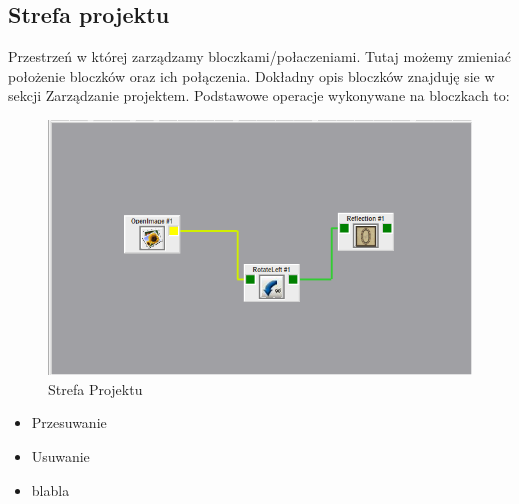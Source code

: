 \documentclass[a4paper,10pt]{article}
\begin{document}
\subsection{Strefa projektu}
Przestrzeń w której zarządzamy bloczkami/połaczeniami. Tutaj możemy zmieniać położenie bloczków oraz ich połączenia. Dokładny opis bloczków znajduję sie w sekcji Zarządzanie projektem.
Podstawowe operacje wykonywane na bloczkach to:
\begin{figure}[h]
 \centering
 \includegraphics[scale=0.5]{strefaprojektu}
 \caption{Strefa Projektu}
 \label{fig:Interface}
\end{figure}
\begin{itemize}
 \item Przesuwanie
 \item Usuwanie
 \item blabla
\end{itemize}
\end{document}
